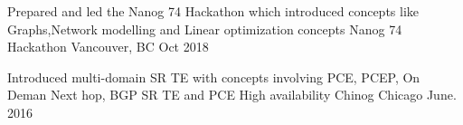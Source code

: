 

\begin{cventries}
  \cventry
    {Prepared and led the Nanog 74 Hackathon which introduced concepts like Graphs,Network modelling and Linear optimization concepts} %
    {Nanog 74 Hackathon} %
    {Vancouver, BC} %
    {Oct 2018} %
    {
      \begin{cvitems} %
      \end{cvitems}
    }

  \cventry
    {Introduced multi-domain SR TE with concepts involving PCE, PCEP, On Deman Next hop, BGP SR TE and PCE High availability} %
    {Chinog} %
    {Chicago} %
    {June. 2016} %
        {
      \begin{cvitems} %
      \end{cvitems}
    }
\end{cventries}
